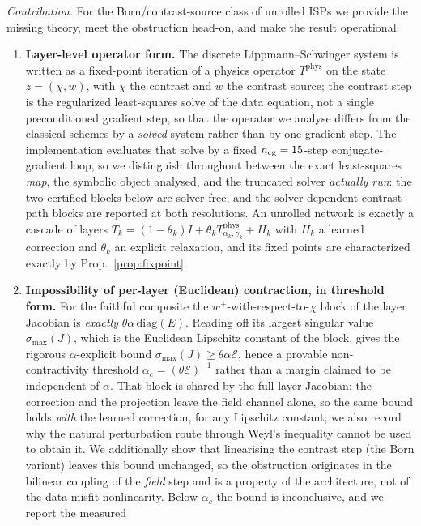 \documentclass[journal,cmes,article,submit,moreauthors,pdftex]{Definitions/tsp}
\newcommand{\numv}[1]{#1}
\begin{document}
\emph{Contribution.} For the Born/contrast-source class of unrolled ISPs we provide the missing
theory, meet the obstruction head-on, and make the result operational:
\begin{enumerate}
\item \textbf{Layer-level operator form.} The discrete
Lippmann--Schwinger system is written as a fixed-point iteration of a physics operator
$T^{\mathrm{phys}}$ on the state $z=(\chi,w)$, with $\chi$ the contrast and $w$ the contrast source; the contrast step is
the regularized least-squares solve of the data equation, not a single preconditioned gradient step,
so that the operator we analyse differs from the classical schemes by a \emph{solved} system rather
than by one gradient step. The implementation evaluates that solve by a fixed
$n_{\mathrm{cg}}=\numv{\NumNCg}$-step conjugate-gradient loop, so we distinguish throughout between
the exact least-squares \emph{map}, the symbolic object analysed, and the truncated solver
\emph{actually run}: the two certified blocks below are solver-free, and the solver-dependent
contrast-path blocks are reported at both resolutions. An unrolled network is exactly a cascade of layers
$T_k = (1-\theta_k)I+\theta_k T^{\mathrm{phys}}_{\alpha_k,\gamma_k} + H_k$ with $H_k$ a learned
correction and $\theta_k$ an explicit relaxation, and its fixed points are characterized exactly by Prop.~\ref{prop:fixpoint}.
\item \textbf{Impossibility of per-layer (Euclidean) contraction, in threshold form.} For the faithful
composite the $w^{+}$-with-respect-to-$\chi$ block of the layer Jacobian is \emph{exactly}
$\theta\alpha\,\mathrm{diag}(E)$. Reading off its largest singular value
$\sigma_{\max}(J)$, which is the Euclidean Lipschitz constant of the block, gives the rigorous
$\alpha$-explicit bound $\sigma_{\max}(J)\ge\theta\alpha\mathcal{E}$, hence a provable
non-contractivity threshold $\alpha_c=(\theta\mathcal{E})^{-1}$ rather than a
margin claimed to be independent of $\alpha$. That block is shared by the full layer Jacobian: the correction and the projection leave the field channel alone, so the same bound holds
\emph{with} the learned correction, for any Lipschitz constant; we also record why the natural
perturbation route through Weyl's inequality cannot be used to obtain it. We additionally show that linearising the contrast
step (the Born variant) leaves this bound unchanged, so the obstruction originates in the bilinear
coupling of the \emph{field} step and is a property of the architecture, not of the data-misfit
nonlinearity. Below $\alpha_c$ the bound is inconclusive, and we report the measured

\end{enumerate}
\end{document}
